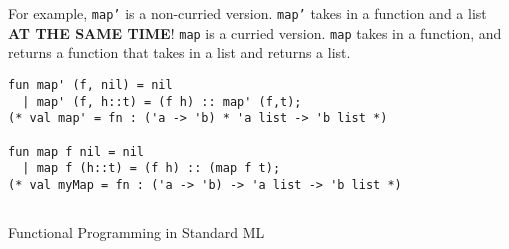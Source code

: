 For example, \texttt{map'} is a non-curried version.
\texttt{map'} takes in a function and a list \textbf{AT THE SAME TIME}!
\texttt{map} is a curried version.
\texttt{map} takes in a function, and returns a function that takes in a list and returns a list.

\begin{verbatim}
fun map' (f, nil) = nil
  | map' (f, h::t) = (f h) :: map' (f,t);
(* val map' = fn : ('a -> 'b) * 'a list -> 'b list *)

fun map f nil = nil
  | map f (h::t) = (f h) :: (map f t);       
(* val myMap = fn : ('a -> 'b) -> 'a list -> 'b list *)
\end{verbatim}

\subsection{}
Functional Programming in Standard ML

